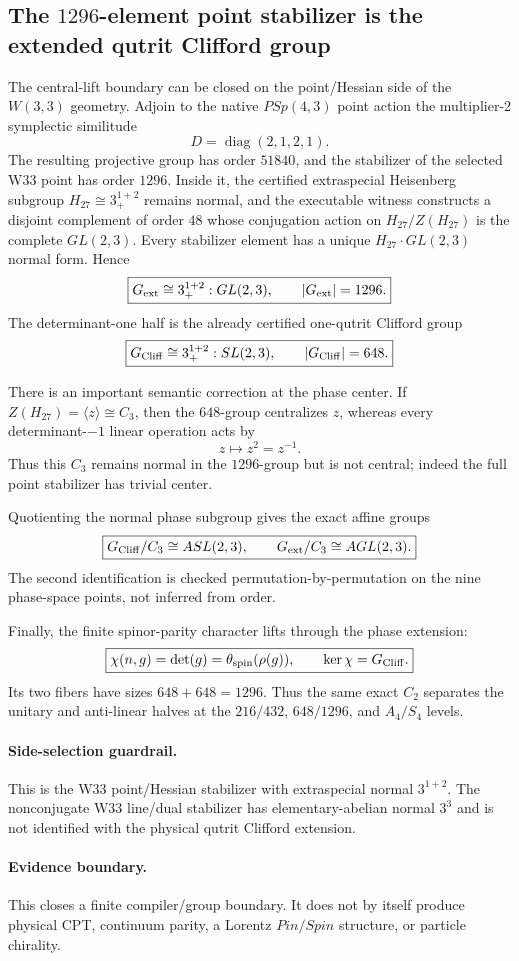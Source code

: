 \subsection*{The \(1296\)-element point stabilizer is the extended qutrit Clifford group}

The central-lift boundary can be closed on the point/Hessian side of the
\(W(3,3)\) geometry. Adjoin to the native \(PSp(4,3)\) point action the
multiplier-\(2\) symplectic similitude
\[
 D=\operatorname{diag}(2,1,2,1).
\]
The resulting projective group has order \(51840\), and the stabilizer of the
selected W33 point has order \(1296\). Inside it, the certified extraspecial
Heisenberg subgroup \(H_{27}\cong3_+^{1+2}\) remains normal, and the executable
witness constructs a disjoint complement of order \(48\) whose conjugation
action on \(H_{27}/Z(H_{27})\) is the complete \(GL(2,3)\). Every stabilizer
element has a unique \(H_{27}\cdot GL(2,3)\) normal form. Hence
\[
 \boxed{
 G_{\rm ext}\cong3_+^{1+2}:GL(2,3),
 \qquad |G_{\rm ext}|=1296.
 }
\]
The determinant-one half is the already certified one-qutrit Clifford group
\[
 \boxed{
 G_{\rm Cliff}\cong3_+^{1+2}:SL(2,3),
 \qquad |G_{\rm Cliff}|=648.
 }
\]

There is an important semantic correction at the phase center. If
\(Z(H_{27})=\langle z\rangle\cong C_3\), then the \(648\)-group centralizes
\(z\), whereas every determinant-\(-1\) linear operation acts by
\[
 \boxed{z\mapsto z^2=z^{-1}.}
\]
Thus this \(C_3\) remains normal in the \(1296\)-group but is not central;
indeed the full point stabilizer has trivial center.

Quotienting the normal phase subgroup gives the exact affine groups
\[
 \boxed{
 G_{\rm Cliff}/C_3\cong ASL(2,3),\qquad
 G_{\rm ext}/C_3\cong AGL(2,3).
 }
\]
The second identification is checked permutation-by-permutation on the nine
phase-space points, not inferred from order.

Finally, the finite spinor-parity character lifts through the phase extension:
\[
 \boxed{
 \chi(n,g)=\det(g)=\theta_{\rm spin}(\rho(g)),
 \qquad
 \ker\chi=G_{\rm Cliff}.
 }
\]
Its two fibers have sizes \(648+648=1296\). Thus the same exact \(C_2\)
separates the unitary and anti-linear halves at the \(216/432\), \(648/1296\),
and \(A_4/S_4\) levels.

\paragraph{Side-selection guardrail.}
This is the W33 point/Hessian stabilizer with extraspecial normal \(3^{1+2}\).
The nonconjugate W33 line/dual stabilizer has elementary-abelian normal
\(3^3\) and is not identified with the physical qutrit Clifford extension.

\paragraph{Evidence boundary.}
This closes a finite compiler/group boundary. It does not by itself produce
physical CPT, continuum parity, a Lorentz \(Pin/Spin\) structure, or particle
chirality.
